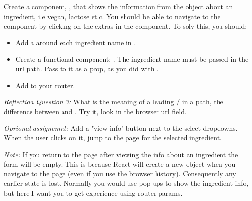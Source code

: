 \documentclass[fleqn, article, a4paper]{memoir}
\begin{document}
\begin{Assignments}
\item Create a component, , that shows the information from the  object about an ingredient, i.e vegan, lactose et.c. You should be able to navigate to the  component by clicking on the extras in the  component. To solv this, you should:

\begin{itemize}
  \item Add a  around each ingredient name in .
  \item Create a functional component: . The ingredient name must be passed in the url path. Pass  to it as a prop, as you did with .
  \item Add  to your router.
\end{itemize}

\noindent \emph{Reflection Question 3:} What is the meaning of a leading / in a path, the difference between  and . Try it, look in the browser url field.

\emph{Oprional assignemnt:} Add a "view info" button next to the select dropdowns. When the user clicks on it, jump to the  page for the selected ingredient.

\emph{Note:} If you return to the  page after viewing the info about an ingredient the form will be empty. This is because React will create a new  object when you navigate to the page (even if you use the browser history). Consequently any earlier state is lost. Normally you would use pop-ups to show the ingredient info, but here I want you to get experience using router params.


\end{Assignments}
\end{document}
